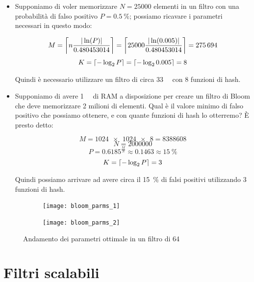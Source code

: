 \begin{itemize}
	\medskip

	\item Supponiamo di voler memorizzare $N=\num{25000}$ elementi in un filtro con una probabilità di
	falso positivo $P=\SI{0.5}{\percent}$; possiamo ricavare i parametri necessari in questo modo:

	$$ M = \ceil*{n\frac{|\ln(P)|}{0.480453014}} = \ceil*{25000\frac{|\ln(0.005)|}{0.480453014}} = \num{275694} $$
	$$ K = \ceil*{-\log_2{P}} = \ceil*{-\log_2{0.005}} = 8 $$

	Quindi è necessario utilizzare un filtro di circa \SI{33}{\kibi\byte} con \num{8} funzioni di hash.

	\item Supponiamo di avere \SI{1}{\mebi\byte} di RAM a disposizione per creare un filtro di Bloom che deve
	memorizzare 2 milioni di elementi. Qual è il valore minimo di falso positivo che possiamo
	ottenere, e con quante funzioni di hash lo otterremo? È presto detto:

	$$ M = \num{1024 x 1024 x 8} = \num{8388608} $$
	$$ N = \num{2000000} $$
	$$ P = 0.6185 ^ \frac{M}{N} \approx 0.1463 \approx \SI{15}{\percent} $$
	$$ K = \ceil*{-\log_2{P}} = 3 $$

	Quindi possiamo arrivare ad avere circa il \SI{15}{\percent} di falsi positivi utilizzando
	\num{3} funzioni di hash.
\end{itemize}

\begin{figure}
	\centering

	\begin{subfigure}[t]{280pt}
	\centering\texttt{[image: bloom\_parms\_1]}
	\end{subfigure}

	\begin{subfigure}[t]{280pt}
	\centering\texttt{[image: bloom\_parms\_2]}
	\end{subfigure}

	\caption{Andamento dei parametri ottimale in un filtro di \SI{64}{\mebi\byte}}
\end{figure}


\section{Filtri scalabili}
\label{sec:bloomscalable}

